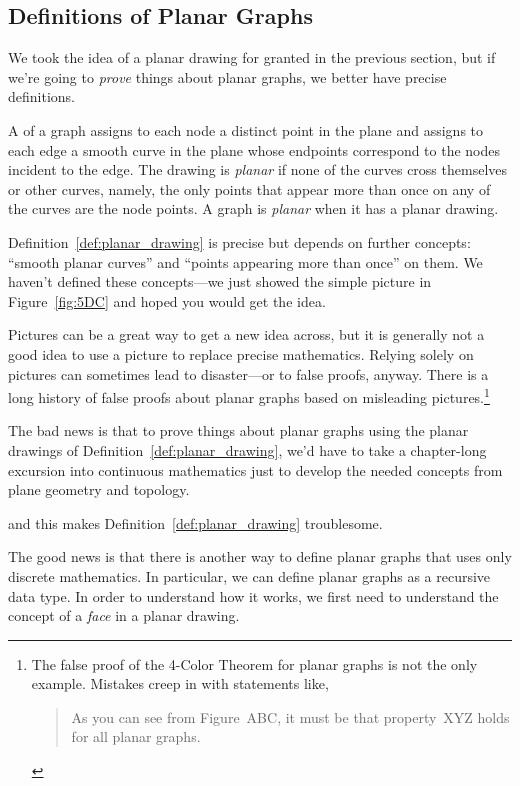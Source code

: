 \subsection{Definitions of Planar Graphs}\label{sec:recdef_planar}

We took the idea of a planar drawing for granted in the previous
section, but if we're going to \emph{prove} things about planar graphs, we
better have precise definitions.

\begin{definition}\label{def:planar_drawing}
A  of a graph assigns to each node a distinct point in
the plane and assigns to each edge a smooth curve in the plane whose
endpoints correspond to the nodes incident to the edge.  The drawing
is \emph{planar} if none of the curves
cross themselves or other curves, namely, the only points that
appear more than once on any of the curves are the node points.  A
graph is \emph{planar} when it has a planar
drawing.
\end{definition}

Definition~\ref{def:planar_drawing} is precise but depends on
further concepts: ``smooth planar curves'' and ``points appearing more
than once'' on them.  We haven't defined these concepts---we just
showed the simple picture in Figure~\ref{fig:5DC} and hoped you would
get the idea.

Pictures can be a great way to get a new idea across, but it is generally
not a good idea to use a picture to replace precise mathematics.  Relying
solely on pictures can sometimes lead to disaster---or to false proofs,
anyway.  There is a long history of false proofs about planar graphs based
on misleading pictures.\footnote{The false proof of the
  4-Color Theorem for planar graphs is not the only example.  Mistakes
  creep in with statements like,
\begin{quote}
    As you can see from Figure~ABC, it must be that property~XYZ holds
    for all planar graphs.
\end{quote}}

The bad news is that to prove things about planar graphs using the planar
drawings of Definition~\ref{def:planar_drawing}, we'd have to take a chapter-long
excursion into continuous mathematics just to develop the needed concepts
from plane geometry and topology.
\begin{editingnotes} and this makes
  Definition~\ref{def:planar_drawing} troublesome.
\end{editingnotes}
The good news is that there is another way to define planar graphs that
uses only discrete mathematics.  In particular, we can define planar
graphs as a recursive data type.  In order to understand how it works, we
first need to understand the concept of a \emph{face} in a planar drawing.

